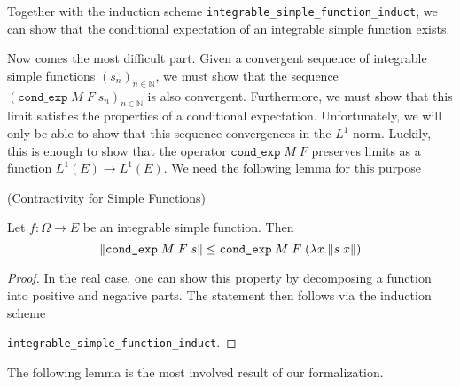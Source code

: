 Together with the induction scheme \texttt{integrable\_simple\_function\_induct}, we can show that the conditional expectation of an integrable simple function exists.

Now comes the most difficult part. Given a convergent sequence of integrable simple functions $(s_n)_{n \in \mathbb{N}}$, we must show that the sequence $(\texttt{cond\_exp} \; M \; F \; s_n)_{n \in \mathbb{N}}$ is also convergent. Furthermore, we must show that this limit satisfies the properties of a conditional expectation. Unfortunately, we will only be able to show that this sequence convergences in the $L^1$-norm. Luckily, this is enough to show that the operator $\texttt{cond\_exp} \; M \; F$ preserves limits as a function $L^1(E) \rightarrow L^1(E)$. We need the following lemma for this purpose

\begin{lemma} (Contractivity for Simple Functions) \par
	Let $f : \Omega \rightarrow E$ be an integrable simple function. Then
	\[
		\normalfont\lVert \texttt{cond\_exp} \; M \; F \; s \rVert \le \texttt{cond\_exp} \; M \; F \; (\lambda x. \lVert s \; x \rVert)
	\]
\end{lemma}
\begin{proof}
	In the real case, one can show this property by decomposing a function into positive and negative parts. The statement then follows via the induction scheme \par\noindent\texttt{integrable\_simple\_function\_induct}.
\end{proof}

The following lemma is the most involved result of our formalization.

